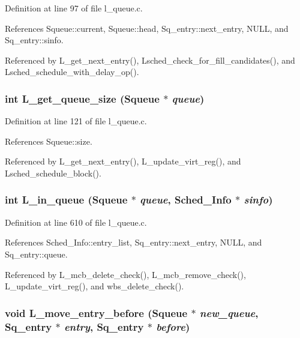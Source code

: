 Definition at line 97 of file l\_\-queue.c.

References Squeue::current, Squeue::head, Sq\_\-entry::next\_\-entry, NULL, and Sq\_\-entry::sinfo.

Referenced by L\_\-get\_\-next\_\-entry(), Lsched\_\-check\_\-for\_\-fill\_\-candidates(), and Lsched\_\-schedule\_\-with\_\-delay\_\-op().
\subsubsection{\setlength{\rightskip}{0pt plus 5cm}int L\_\-get\_\-queue\_\-size (\bf{Squeue} $\ast$ {\em queue})}\label{l__queue_8c_8327b592c57e3869fd7188e366761320}




Definition at line 121 of file l\_\-queue.c.

References Squeue::size.

Referenced by L\_\-get\_\-next\_\-entry(), L\_\-update\_\-virt\_\-reg(), and Lsched\_\-schedule\_\-block().
\subsubsection{\setlength{\rightskip}{0pt plus 5cm}int L\_\-in\_\-queue (\bf{Squeue} $\ast$ {\em queue}, \bf{Sched\_\-Info} $\ast$ {\em sinfo})}\label{l__queue_8c_e1596c8570dd1f1923719e076898d804}




Definition at line 610 of file l\_\-queue.c.

References Sched\_\-Info::entry\_\-list, Sq\_\-entry::next\_\-entry, NULL, and Sq\_\-entry::queue.

Referenced by L\_\-mcb\_\-delete\_\-check(), L\_\-mcb\_\-remove\_\-check(), L\_\-update\_\-virt\_\-reg(), and wbs\_\-delete\_\-check().
\subsubsection{\setlength{\rightskip}{0pt plus 5cm}void L\_\-move\_\-entry\_\-before (\bf{Squeue} $\ast$ {\em new\_\-queue}, \bf{Sq\_\-entry} $\ast$ {\em entry}, \bf{Sq\_\-entry} $\ast$ {\em before})}\label{l__queue_8c_4789ec0e89cb6776c8f4a58758e5c45e}




